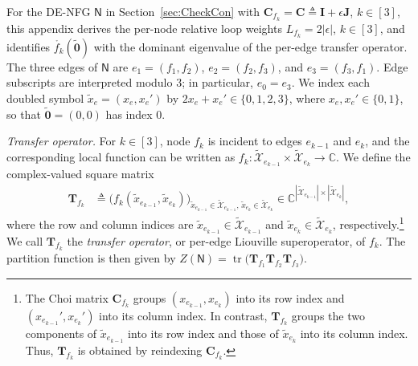 \documentclass[journal]{IEEEtran}
\newcommand{\add}[1]{{\color{black}#1}}
\newcommand{\vect}[1]{ \bm{#1} }
\newcommand{\sC}{\mathbb{C}}
\newcommand{\xe}{ x_{e} }
\newcommand{\graphN}{ \mathsf{N} }
\newcommand{\defeq}{ \triangleq }
\newcommand{\tset}[1]{\tilde{\mathcal{#1}}}
\newcommand{\matr}[1]{\vect{#1}}
\newcommand{\LCT}[1]{ \mathring{#1} }
\newcommand{\tx}{ \tilde{x} }
\newcommand{\txe}{ \tilde{x}_{e} }
\newcommand{\tv}[1]{ \tilde{\vect{#1}} }
\begin{document}
\begin{appendices}
{    \add{For the DE-NFG $\graphN$ in Section~\ref{sec:CheckCon} with
      $\matr{C}_{f_k} = \matr{C}\defeq\matr{I}+\epsilon\matr{J}$, $k \in [3]$,
      this appendix derives the per-node relative loop weights
      $L_{f_k} = 2 |\epsilon|$, $k \in [3]$, and identifies
      $\LCT{f_k}(\tv{0})$ with the dominant eigenvalue of the per-edge
      transfer operator. The three edges of $\graphN$ are $e_1 = (f_1,f_2)$,
      $e_2 = (f_2,f_3)$, and $e_3 = (f_3,f_1)$. Edge subscripts are
      interpreted modulo $3$; in particular, $e_0 = e_3$. We index each
      doubled symbol $\txe = (\xe,\xe')$ by $2\xe+\xe'\in\{0,1,2,3\}$, where
      $\xe,\xe'\in\{0,1\}$, so that $\tv{0}=(0,0)$ has index $0$.}

    \emph{Transfer operator.} \add{For $k\in[3]$, node $f_k$ is incident to
      edges $e_{k-1}$ and $e_k$, and the corresponding local function can be
      written as $f_k:\tset{X}_{e_{k-1}}\times\tset{X}_{e_k}\to\sC$.} We
    define the complex-valued square matrix
    \begin{align*}
      \matr{T}_{f_k}
       & \defeq
      \bigl( f_k( \tx_{e_{k-1}}, \tx_{e_k} ) \bigr)_{
                                               \tx_{e_{k-1}} \in \tset{X}_{e_{k-1}},\, \tx_{e_k} \in \tset{X}_{e_k} } \in \sC^{ |\tset{X}_{e_{k-1}}| \times |\tset{X}_{e_k}| },
    \end{align*}
    where the row and column indices are
    $\tx_{e_{k-1}}\in\tset{X}_{e_{k-1}}$ and
    $\tx_{e_k}\in\tset{X}_{e_k}$, respectively.\footnote{The Choi matrix
      $\matr{C}_{f_k}$ groups $(x_{e_{k-1}},x_{e_k})$ into its row index and $(x_{e_{k-1}}',x_{e_k}')$ into its column index. In contrast, $\matr{T}_{f_k}$
      groups the two components of $\tx_{e_{k-1}}$ into its row index and those
      of $\tx_{e_k}$ into its column index. Thus, $\matr{T}_{f_k}$ is obtained
      by reindexing $\matr{C}_{f_k}$.} We call $\matr{T}_{f_k}$
    the \emph{transfer operator}, or per-edge Liouville superoperator, of
    $f_k$. The partition function is then given by
    $Z(\graphN) = \operatorname{tr}\bigl(\matr{T}_{f_1}\matr{T}_{f_2}\matr{T}_{f_3}\bigr)$.

}
\end{appendices}
\end{document}
